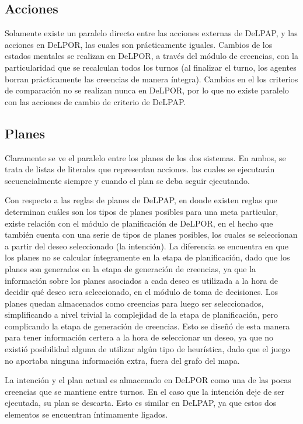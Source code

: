\subsection{Acciones}

Solamente existe un paralelo directo entre las acciones externas de DeLPAP, y las acciones en DeLPOR, 
las cuales son prácticamente iguales. Cambios de los estados mentales se realizan en DeLPOR, a través
del módulo de creencias, con la particularidad que se recalculan todos los turnos (al finalizar el
turno, los agentes borran prácticamente las creencias de manera íntegra). Cambios en el los criterios
de comparación no se realizan nunca en DeLPOR, por lo que no existe paralelo con las acciones de
cambio de criterio de DeLPAP.

\subsection{Planes}

Claramente se ve el paralelo entre los planes de los dos sistemas. En ambos, se trata de listas de 
literales que representan acciones. las cuales se ejecutarán secuencialmente siempre y cuando el plan
se deba seguir ejecutando.

Con respecto a las reglas de planes de DeLPAP, en donde existen reglas que determinan cuáles son los
tipos de planes posibles para una meta particular, existe relación con el módulo de planificación de
DeLPOR, en el hecho que también cuenta con una serie de tipos de planes posibles, los cuales se 
seleccionan a partir del deseo seleccionado (la intención). La diferencia se encuentra en que los 
planes no se calcular íntegramente en la etapa de planificación, dado que los planes son generados en 
la etapa de generación de creencias, ya que la información sobre los planes asociados a cada deseo es
utilizada a la hora de decidir qué deseo sera seleccionado, en el módulo de toma de decisiones. Los 
planes quedan almacenados como creencias para luego ser seleccionados, simplificando a nivel trivial 
la complejidad de la etapa de planificación, pero complicando la etapa de generación de creencias. 
Esto se diseñó de esta manera para tener información certera a la hora de seleccionar un deseo, ya que
no existió posibilidad alguna de utilizar algún tipo de heurística, dado que el juego no aportaba
ninguna información extra, fuera del grafo del mapa.

La intención y el plan actual es almacenado en DeLPOR como una de las pocas creencias que se mantiene
entre turnos. En el caso que la intención deje de ser ejecutada, su plan se descarta. Esto es similar
en DeLPAP, ya que estos dos elementos se encuentran íntimamente ligados.

